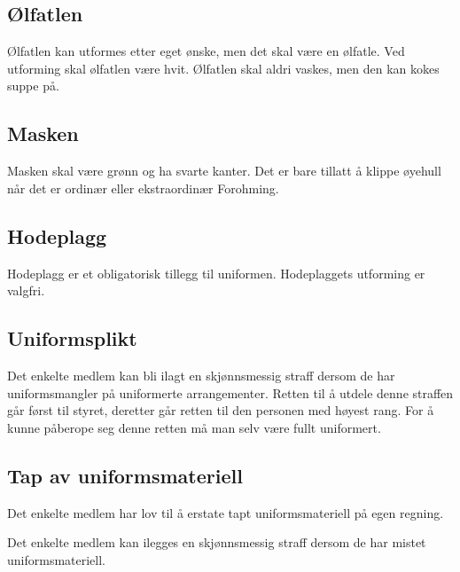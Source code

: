     \subsection{Ølfatlen}
        \begin{statute}
            Ølfatlen kan utformes etter eget ønske, men det skal være en ølfatle. Ved utforming skal ølfatlen være hvit. Ølfatlen skal aldri vaskes, men den kan kokes suppe på.
        \end{statute}
        
    \subsection{Masken}
        \begin{statute}
            Masken skal være grønn og ha svarte kanter. Det er bare tillatt å klippe øyehull når det er ordinær eller ekstraordinær Forohming.
        \end{statute}
        
    \subsection{Hodeplagg}
        \begin{statute}
            Hodeplagg er et obligatorisk tillegg til uniformen. Hodeplaggets utforming er valgfri.
        \end{statute}

    \subsection{Uniformsplikt}
        \begin{statute}
            Det enkelte medlem kan bli ilagt en skjønnsmessig straff dersom de har uniformsmangler på uniformerte arrangementer. Retten til å utdele denne straffen går først til styret, deretter går retten til den personen med høyest rang. For å kunne påberope seg denne retten må man selv være fullt uniformert.
        \end{statute}

    \subsection{Tap av uniformsmateriell}
        \begin{statute}
            Det enkelte medlem har lov til å erstate tapt uniformsmateriell på egen regning.
        \end{statute}
        \begin{statute}
            Det enkelte medlem kan ilegges en skjønnsmessig straff dersom de har mistet uniformsmateriell.
        \end{statute}
        
